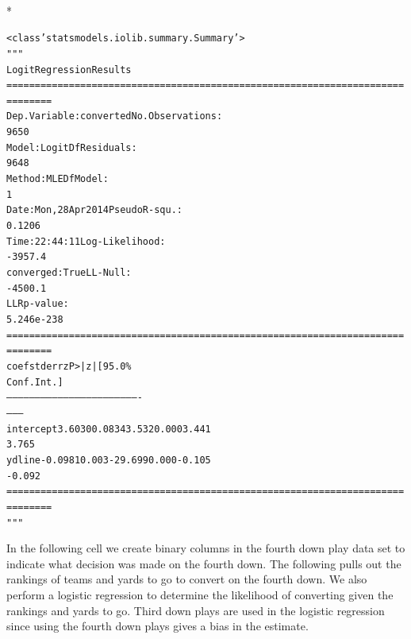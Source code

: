 \documentclass[letterpaper,10pt,english]{/anaconda/lib/python2.7/site-packages/sphinx/texinputs/sphinxhowto}
\def\smaller{\fontsize{9.5pt}{9.5pt}\selectfont}
\newenvironment{InvisibleVerbatim}
        {\begin{mdframed}[leftmargin=0.1\linewidth,innerleftmargin=3pt,innerrightmargin=3pt, userdefinedwidth=1\linewidth, linewidth=0pt, linecolor=white, usetwoside=false]}
        {\end{mdframed}}
\begin{document}
                \makebox[0.1\linewidth]{\smaller\hfill\tt\color{nbframe-out-prompt}Out\hspace{4pt}{[}18{]}:\hspace{4pt}}\\*
                \vspace{-2.55\baselineskip}\begin{InvisibleVerbatim}
                \vspace{-0.5\baselineskip}
\begin{alltt}<class 'statsmodels.iolib.summary.Summary'>
"""
                           Logit Regression Results
======================================================================
========
Dep. Variable:              converted   No. Observations:
9650
Model:                          Logit   Df Residuals:
9648
Method:                           MLE   Df Model:
1
Date:                Mon, 28 Apr 2014   Pseudo R-squ.:
0.1206
Time:                        22:44:11   Log-Likelihood:
-3957.4
converged:                       True   LL-Null:
-4500.1
                                        LLR p-value:
5.246e-238
======================================================================
========
                 coef    std err          z      P>|z|      [95.0\%
Conf. Int.]
----------------------------------------------------------------------
--------
intercept      3.6030      0.083     43.532      0.000         3.441
3.765
ydline        -0.0981      0.003    -29.699      0.000        -0.105
-0.092
======================================================================
========
"""\end{alltt}

            \end{InvisibleVerbatim}
            
        
    

In the following cell we create binary columns in the fourth down play
data set to indicate what decision was made on the fourth down.
The following pulls out the rankings of teams and yards to go to convert
on the fourth down. We also perform a logistic regression to determine
the likelihood of converting given the rankings and yards to go. Third
down plays are used in the logistic regression since using the fourth
down plays gives a bias in the estimate.

    

        
\end{document}
